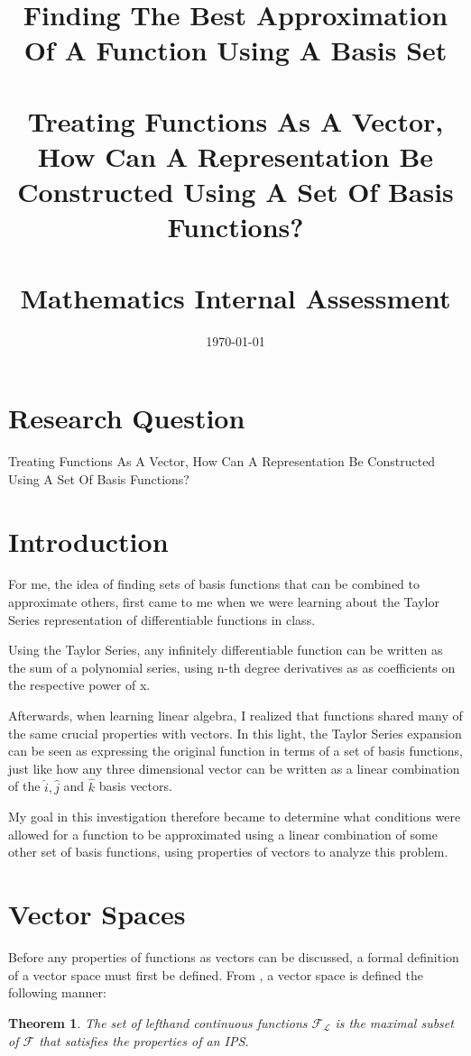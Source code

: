 \documentclass{article}
\title{
  {\LARGE
   \textbf{Finding The Best Approximation Of A Function Using A Basis Set}
   }\\~\\
   {\large
    Treating Functions As A Vector, How Can A Representation Be Constructed Using A Set Of Basis Functions?
   }\\~\\
  {\large Mathematics Internal Assessment}\\
}
\date{\today}
\newtheorem{theorem}{Theorem}[section]
\theoremstyle{definition}
\theoremstyle{remark}
\begin{document}
\maketitle
\pagebreak


\tableofcontents
\pagebreak

\section{Research Question}
Treating Functions As A Vector, How Can A Representation Be Constructed Using A Set Of Basis Functions?

\section{Introduction}
For me, the idea of finding sets of basis functions that can be combined to approximate 
others, first came to me when we were learning about the 
Taylor Series representation of differentiable functions in class.

Using the Taylor Series, any infinitely differentiable 
function can be written as the sum of a polynomial series,
using n-th degree derivatives as as coefficients on the 
respective power of x.

Afterwards, when learning linear algebra, I realized that 
functions shared many of the same crucial properties with vectors.
In this light, the Taylor Series expansion can be seen 
as expressing the original function in terms of a set 
of basis functions, just like how any three dimensional 
vector can be written as a linear combination of the $\hat{i}, \hat{j}$ and $\hat{k}$
basis vectors.

My goal in this investigation therefore became to determine
what conditions were allowed for a function to be 
approximated using a linear combination of some other set of basis functions,
using properties of vectors to analyze this problem.

\section{Vector Spaces}

Before any properties of functions as vectors can be discussed, 
a formal definition of a vector space must first be defined. 
From \cite{AdvancedCalculus}, a vector space is defined the following
manner: 


\begin{theorem}
  The set of lefthand continuous functions $\mathscr{F}_{\mathcal{L}}$ is the
  maximal subset of $\mathscr{F}$ that satisfies the properties of an IPS.
\end{theorem}
\end{document}
